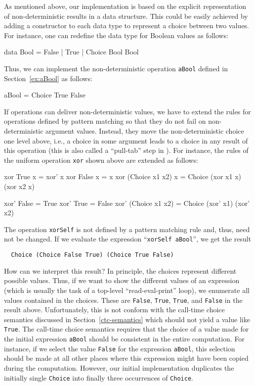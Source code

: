 \documentclass{llncs}
\newcommand{\code}[1]{\mbox{\small\texttt{#1}}}
\newcommand{\ccode}[1]{``\code{#1}''}
\begin{document}
As mentioned above, our implementation is based on the explicit
representation of non-deterministic results in a data structure.
This could be easily achieved by adding a constructor
to each data type to represent a choice between two values.
For instance, one can redefine the data type for Boolean values
as follows:
\begin{haskell}
  data Bool = False | True | Choice Bool Bool
\end{haskell}
Thus, we can implement the non-deterministic operation \code{aBool}
defined in Section~\ref{ex:aBool} as follows:
\begin{haskell}
  aBool = Choice True False
\end{haskell}
If operations can deliver non-deterministic values,
we have to extend the rules for operations defined by
pattern matching so that they do not fail on non-deterministic argument
values. Instead, they move the non-deterministic choice one level above,
i.e., a choice in some argument leads to a choice in any result
of this operation (this is also called a ``pull-tab'' step in
\cite{AlqaddoumiAntoyFischerReck10}). For instance,
the rules of the uniform operation \code{xor} shown above
are extended as follows:
%
\begin{curry}
  xor True           x = xor' x
  xor False          x = x
  xor (Choice x1 x2) x = Choice (xor x1 x) (xor x2 x)

  xor' False          = True
  xor' True           = False
  xor' (Choice x1 x2) = Choice (xor' x1) (xor' x2)
\end{curry}
%
The operation \code{xorSelf} is not defined by a pattern matching rule
and, thus, need not be changed.
If we evaluate the expression \ccode{xorSelf aBool}, we get the result
\begin{lstlisting}
  Choice (Choice False True) (Choice True False)
\end{lstlisting}
How can we interpret this result?
In principle, the choices represent different possible values.
Thus, if we want to show the different values of an expression
(which is usually the task of a top-level ``read-eval-print'' loop),
we enumerate all values contained in the choices.
These are \code{False}, \code{True}, \code{True}, and \code{False}
in the result above.
Unfortunately, this is not conform with the call-time choice semantics
discussed in Section~\ref{ctc-semantics} which should not yield
a value like \code{True}.
The call-time choice semantics requires that the choice
of a value made for
the initial expression \code{aBool} should be consistent
in the entire computation.
For instance, if we select the value \code{False} for the
expression \code{aBool}, this selection should be made
at all other places where this expression might have been copied
during the computation. However, our initial implementation
duplicates the initially single \code{Choice} into finally three
occurrences of \code{Choice}.
\end{document}

